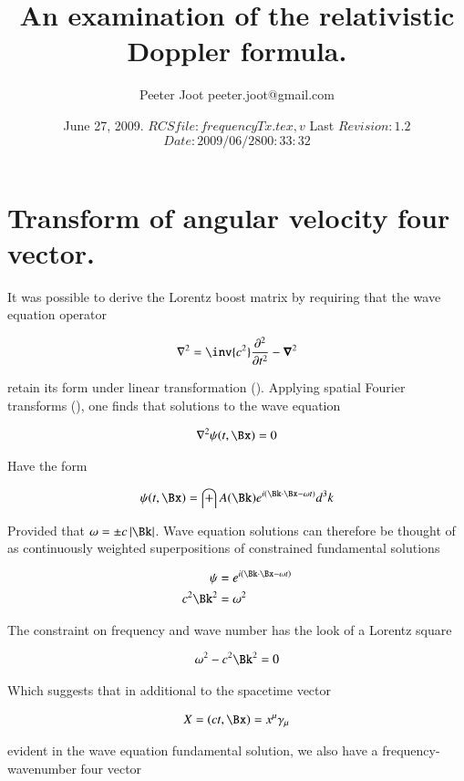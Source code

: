 \documentclass{article}
\title{An examination of the relativistic Doppler formula.}
\author{Peeter Joot \quad peeter.joot@gmail.com }
\date{June 27, 2009.  $RCSfile: frequencyTx.tex,v $ Last $Revision: 1.2 $ $Date: 2009/06/28 00:33:32 $ }
\begin{document}
\maketitle{}
\tableofcontents
\section{Transform of angular velocity four vector.}

It was possible to derive the Lorentz boost matrix by requiring that the wave equation operator

\begin{align}
\grad^2 = \inv{c^2}\frac{\partial^2}{\partial t^2} - \spacegrad^2
\end{align}

retain its form under linear transformation (\cite{PJLorentzWave}).  Applying spatial Fourier transforms (\cite{PJwaveFourier}), one finds that solutions to the wave equation 

\begin{align}
\grad^2 \psi(t,\Bx) = 0
\end{align}

Have the form

\begin{align}
\psi(t, \Bx) = \int A(\Bk) e^{i(\Bk \cdot \Bx - \omega t)} d^3 k
\end{align}

Provided that $\omega = \pm c \Abs{\Bk}$.  Wave equation solutions can therefore be thought of as continuously weighted superpositions of constrained fundamental solutions

\begin{align}
\psi &= e^{i(\Bk \cdot \Bx - \omega t)} \\
c^2 \Bk^2 &= \omega^2
\end{align}

The constraint on frequency and wave number has the look of a Lorentz square

\begin{align}
\omega^2 - c^2 \Bk^2 = 0
\end{align}

Which suggests that in additional to the spacetime vector

\begin{align}
X = (ct, \Bx) = x^\mu \gamma_\mu
\end{align}

evident in the wave equation fundamental solution, we also have a frequency-wavenumber four vector
\end{document}
